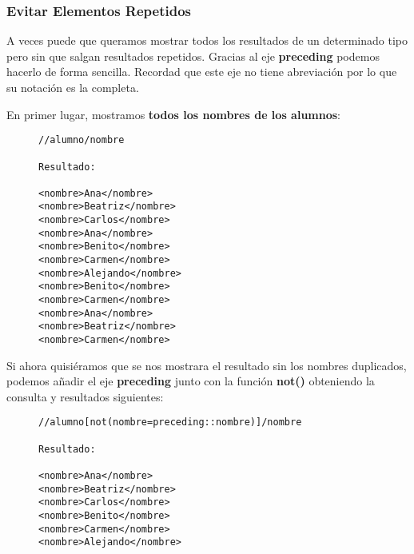 \subsubsection{Evitar Elementos Repetidos}
A veces puede que queramos mostrar todos los resultados de un determinado tipo pero sin que salgan resultados repetidos. Gracias al eje \textbf{preceding} podemos hacerlo de forma sencilla. Recordad que este eje no tiene abreviación por lo que su notación es la completa.

En primer lugar, mostramos \textbf{todos los nombres de los alumnos}:

\begin{figure}[H]
    \begin{tcolorbox}[sharp corners, colback=yellow!30, colframe=white!20]
        \scriptsize
\begin{verbatim}
//alumno/nombre

Resultado:

<nombre>Ana</nombre>
<nombre>Beatriz</nombre>
<nombre>Carlos</nombre>
<nombre>Ana</nombre>
<nombre>Benito</nombre>
<nombre>Carmen</nombre>
<nombre>Alejando</nombre>
<nombre>Benito</nombre>
<nombre>Carmen</nombre>
<nombre>Ana</nombre>
<nombre>Beatriz</nombre>
<nombre>Carmen</nombre>
\end{verbatim}
    \end{tcolorbox}
\end{figure}

Si ahora quisiéramos que se nos mostrara el resultado sin los nombres duplicados, podemos añadir el eje \textbf{preceding} junto con la función \textbf{not()} obteniendo la consulta y resultados siguientes:

\begin{figure}[H]
    \begin{tcolorbox}[sharp corners, colback=yellow!30, colframe=white!20]
        \scriptsize
\begin{verbatim}
//alumno[not(nombre=preceding::nombre)]/nombre

Resultado:

<nombre>Ana</nombre>
<nombre>Beatriz</nombre>
<nombre>Carlos</nombre>
<nombre>Benito</nombre>
<nombre>Carmen</nombre>
<nombre>Alejando</nombre>
\end{verbatim}
    \end{tcolorbox}
\end{figure}
\appendix



